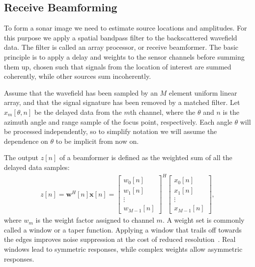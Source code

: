\documentclass[10pt,journal,draftclsnofoot,onecolumn]{IEEEtran}
\newcommand\bmat[1]{\begin{bmatrix}#1\end{bmatrix}}
\renewcommand\H{^{\scriptscriptstyle H}}
\renewcommand\vec[1]{\boldsymbol{#1}}
\newcommand\1{\vec 1}
\newcommand*\w{\vec w}
\newcommand*\x{\vec x}
\begin{document}
% 
% 


\newpage
\subsection{Receive Beamforming}

To form a sonar image we need to estimate source locations and amplitudes. For this purpose we apply a spatial bandpass filter to the backscattered wavefield data. The filter is called an array processor, or receive beamformer. The basic principle is to apply a delay and weights to the sensor channels before summing them up, chosen such that signals from the location of interest are summed coherently, while other sources sum incoherently.

Assume that the wavefield has been sampled by an $M$ element uniform linear array, and that the signal signature has been removed by a matched filter. Let $x_m[\theta,n]$ be the delayed data from the $m$th channel, where the $\theta$ and $n$ is the azimuth angle and range sample of the focus point, respectively. Each angle $\theta$ will be processed independently, so to simplify notation we will assume the dependence on $\theta$ to be implicit from now on. 

The output $z[n]$ of a beamformer is defined as the weighted sum of all the delayed data samples:
%
\begin{align}
z[n] = \w\H[n]\x[n] = \bmat{w_0[n]\\w_1[n]\\\vdots\\w_{M-1}[n]}^H \bmat{x_0[n]\\x_1[n]\\\vdots\\x_{M-1}[n]},\label{z}
\end{align}
%
where $w_m$ is the weight factor assigned to channel $m$. A weight set is commonly called a window or a taper function. Applying a window that trails off towards the edges improves noise suppression at the cost of reduced resolution~\cite{Harris1978}. Real windows lead to symmetric responses, while complex weights allow asymmetric responses.
\end{document}
